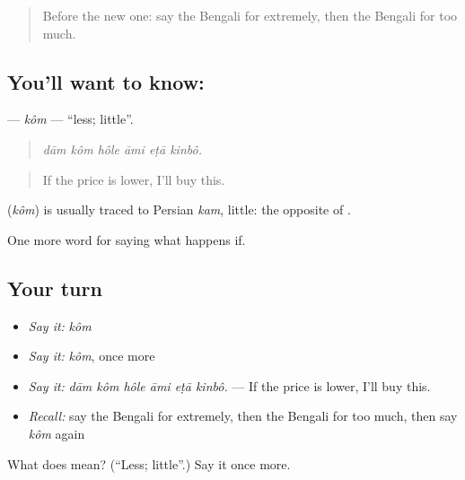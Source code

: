 \begin{quote}
Before the new one: say the Bengali for extremely, then the Bengali for too much.
\end{quote}

\subsection*{You'll want to know: }
\textbf{} — \emph{kôm} — \textquotedblleft{}less; little\textquotedblright{}.

\begin{quote}
     
\end{quote}

\begin{quote}
\emph{dām kôm hôle āmi eṭā kinbô.}
\end{quote}

\begin{quote}
If the price is lower, I'll buy this.
\end{quote}

\begin{cousinweb}
\textbf{} (\emph{kôm}) is usually traced to Persian \emph{kam}, little: the opposite of .
\end{cousinweb}

\begin{grammarlens}[title={What you've built}]
One more word for saying what happens if.
\end{grammarlens}

\subsection*{Your turn}
\begin{itemize}
\raggedright
  \item \emph{Say it:} \emph{kôm}
  \item \emph{Say it:} \emph{kôm}, once more
  \item \emph{Say it:} \emph{dām kôm hôle āmi eṭā kinbô.} — If the price is lower, I'll buy this.
  \item \emph{Recall:} say the Bengali for extremely, then the Bengali for too much, then say \emph{kôm} again
\end{itemize}

\begin{tcolorbox}[breakable,colback=teal!4,colframe=teal!35!black,title={Before you move on}]
What does  mean? (\textquotedblleft{}Less; little\textquotedblright{}.) Say it once more.
\end{tcolorbox}

